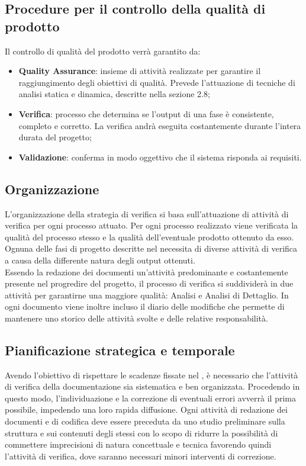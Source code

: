 \subsection{Procedure per il controllo della qualità di prodotto}
Il controllo di qualità del prodotto verrà garantito da:
\begin{itemize}
\item \textbf{Quality Assurance}: insieme di attività realizzate per garantire il raggiungimento degli obiettivi di qualità. Prevede l'attuazione di tecniche di analisi statica e dinamica, descritte nella sezione 2.8;
\item \textbf{Verifica}: processo che determina se l'output di una fase è consistente, completo e corretto. La verifica andrà eseguita costantemente durante l'intera durata del progetto;
\item \textbf{Validazione}: conferma in modo oggettivo che il sistema risponda ai requisiti. 
\end{itemize}

\subsection{Organizzazione}
L'organizzazione della strategia di verifica si basa sull'attuazione di attività di verifica per ogni processo attuato. Per ogni processo realizzato viene verificata la qualità del processo stesso e la qualità dell'eventuale prodotto ottenuto da esso.\\
Ognuna delle fasi di progetto descritte nel \textit{\PdP} necessita di diverse attività di verifica a causa della differente natura degli output ottenuti.\\
Essendo la redazione dei documenti un'attività predominante e costantemente presente nel progredire del progetto, il processo di verifica si suddividerà in due attività per garantirne una maggiore qualità: Analisi e Analisi di Dettaglio. In ogni documento viene inoltre incluso il diario delle modifiche che permette di mantenere uno storico delle attività svolte e delle relative responsabilità.

\subsection{Pianificazione strategica e temporale}
Avendo l'obiettivo di rispettare le scadenze fissate nel \textit{\PdP}, è necessario che l'attività di verifica della documentazione sia sistematica e ben organizzata. Procedendo in questo modo, l'individuazione e la correzione di eventuali errori avverrà il prima possibile, impedendo una loro rapida diffusione. Ogni attività di redazione dei documenti e di codifica deve essere preceduta da uno studio preliminare sulla struttura e sui contenuti degli stessi con lo scopo di ridurre la possibilità di commettere imprecisioni di natura concettuale e tecnica favorendo quindi l'attività di verifica, dove saranno necessari minori interventi di correzione.


